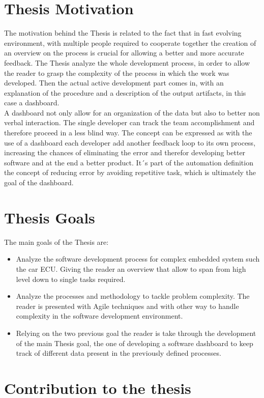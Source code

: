 \documentclass[../main.tex]{subfiles}
\begin{document}
\section{Thesis Motivation}
The motivation behind the Thesis is related to the fact that in fast evolving environment, with multiple people required to cooperate together the creation of an overview on the process is crucial for allowing a better and more accurate feedback. 
The Thesis analyze the whole development process, in order to allow the reader to grasp the complexity of the process in which the work was developed. Then the actual active development part comes in, with an explanation of the procedure and a description of the output artifacts, in this case a dashboard.\\
A dashboard not only allow for an organization of the data but also to better non verbal interaction. The single developer can track the team accomplishment and therefore proceed in a less blind way. The concept can be expressed as with the use of a dashboard each developer add another feedback loop to its own process, increasing the chances of eliminating the error and therefor developing better software and at the end a better product. It´s part of the automation definition the concept of reducing error by avoiding repetitive task, which is ultimately the goal of the dashboard. 
\section{Thesis Goals}
The main goals of the Thesis are:
\begin{itemize}
    \item Analyze the software development process for complex embedded system such the car ECU. Giving the reader an overview that allow to span from high level down to single tasks required. 
    \item Analyze the processes and methodology to tackle problem complexity. The reader is presented with Agile techniques and with other way to handle complexity in the software development environment.
    \item Relying on the two previous goal the reader is take through the development of the main Thesis goal, the one of developing a software dashboard to keep track of different data present in the previously defined processes.
\end{itemize}
\section{Contribution to the thesis}
\cleardoublepage
\end{document}
